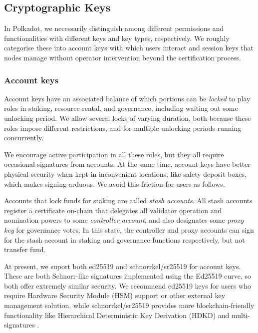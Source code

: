 \subsection{Cryptographic Keys}\label{sec:crypto}

In Polkadot, we necessarily distinguish among different permissions and functionalities with different keys and key types, respectively.  We roughly categorise these into account keys with which users interact and session keys that nodes manage without operator intervention beyond the certification process.

\subsubsection{Account keys}

Account keys have an associated balance of which portions can be {\em locked} to play roles in staking, resource rental, and governance, including waiting out some unlocking period.  We allow several locks of varying duration, both because these roles impose different restrictions, and for multiple unlocking periods running concurrently. 

We encourage active participation in all these roles, but they all require occasional signatures from accounts.  At the same time, account keys have better physical security when kept in inconvenient locations, like safety deposit boxes, which makes signing arduous.  We avoid this friction for users as follows.

Accounts that lock funds for staking are called {\em stash accounts}.  All stash accounts register a certificate on-chain that delegates all validator operation and nomination powers to some {\em controller account}, and also designates some {\em proxy key} for governance votes.  In this state, the controller and proxy accounts can sign for the stash account in staking and governance functions respectively, but not transfer fund.  

\smallskip

At present, we suport both ed25519 \cite{} and schnorrkel/sr25519 \cite{} for account keys.  These are both Schnorr-like signatures implemented using the Ed25519 curve, so both offer extremely similar security.  We recommend ed25519 keys for users who require Hardware Security Module (HSM) support or other external key management solution, while schnorrkel/sr25519 provides more blockchain-friendly functionality like Hierarchical Deterministic Key Derivation (HDKD) and multi-signatures \cite{}.  

